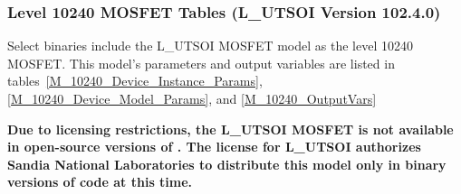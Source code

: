 \clearpage
\subsubsection{Level 10240 MOSFET Tables (L\_UTSOI Version 102.4.0)}
Select \Xyce{} binaries include the L\_UTSOI MOSFET model as the level
10240 MOSFET.  This model's parameters and output variables are listed in tables~\ref{M_10240_Device_Instance_Params}, \ref{M_10240_Device_Model_Params}, and \ref{M_10240_OutputVars}





\textbf{Due to licensing restrictions, the L\_UTSOI MOSFET is not
  available in open-source versions of \Xyce{}.  The license for
  L\_UTSOI authorizes Sandia National Laboratories to distribute this
  model only in binary versions of code at this time.}

